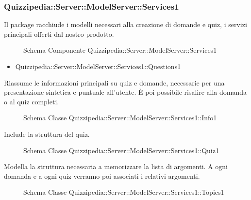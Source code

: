 \subsubsection{Quizzipedia::Server::ModelServer::Services1}
Il package racchiude i modelli necessari alla creazione di domande e quiz, i servizi principali offerti dal nostro prodotto.
\begin{figure}[H]
\centering
\noindent{}
\caption{Schema Componente Quizzipedia::Server::ModelServer::Services1}
\end{figure}
\begin{itemize}
\item Quizzipedia::Server::ModelServer::Services1::Questions1
\end{itemize}
Riassume le informazioni principali su quiz e domande, necessarie per una presentazione sintetica e puntuale all'utente. È poi possibile risalire alla domanda o al quiz completi.
\begin{figure}[H]
\centering
\noindent{}
\caption{Schema Classe Quizzipedia::Server::ModelServer::Services1::Info1}
\end{figure}
Include la struttura del quiz.
\begin{figure}[H]
\centering
\noindent{}
\caption{Schema Classe Quizzipedia::Server::ModelServer::Services1::Quiz1}
\end{figure}
Modella la struttura necessaria a memorizzare la lista di argomenti. A ogni domanda e a ogni quiz verranno poi associati i relativi argomenti.
\begin{figure}[H]
\centering
\noindent{}
\caption{Schema Classe Quizzipedia::Server::ModelServer::Services1::Topics1}
\end{figure}

